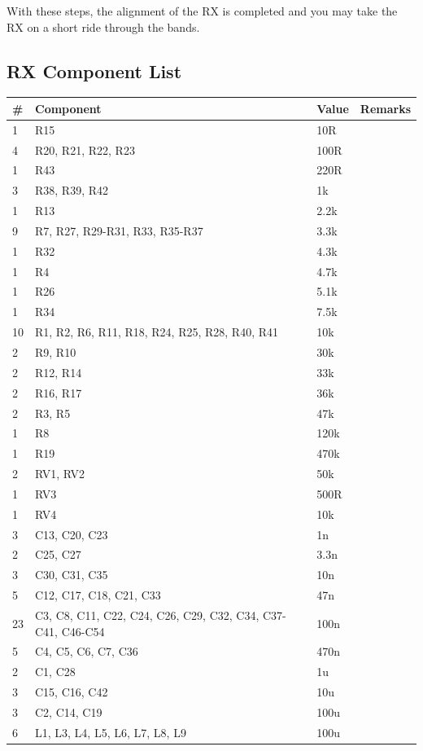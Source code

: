 \documentclass[10pt, a4paper,twoside,openright]{scrartcl}
\begin{document}
With these steps, the alignment of the RX is completed and you may take the RX on a short ride through the bands.

\clearpage
\subsection{RX Component List}  \label{sec:rxcomp}
\begin{longtable}{|l|p{6cm}|l|l|} \hline 
\# & Component & Value & Remarks \\ \hline 
1 & R15 & 10R & \\
4 & R20, R21, R22, R23 & 100R & \\
1 & R43 & 220R & \\
3 & R38, R39, R42 & 1k & \\
1 & R13 & 2.2k & \\
9 & R7, R27, R29-R31, R33, R35-R37 & 3.3k & \\
1 & R32 & 4.3k & \\
1 & R4 & 4.7k & \\
1 & R26 & 5.1k & \\
1 & R34 & 7.5k & \\
10 & R1, R2, R6, R11, R18, R24, R25, R28, R40, R41 & 10k & \\
2 & R9, R10 & 30k & \\
2 & R12, R14 & 33k & \\
2 & R16, R17 & 36k & \\
2 & R3, R5 & 47k & \\
1 & R8 & 120k & \\
1 & R19 & 470k & \\
2 & RV1, RV2 & 50k & \\
1 & RV3 & 500R & \\
1 & RV4 & 10k & \\
3 & C13, C20, C23 & 1n & \\
2 & C25, C27 & 3.3n & \\
3 & C30, C31, C35 & 10n & \\
5 & C12, C17, C18, C21, C33 & 47n & \\
23 & C3, C8, C11, C22, C24, C26, C29, C32, C34, C37-C41, C46-C54 & 100n & \\
5 & C4, C5, C6, C7, C36 & 470n & \\
2 & C1, C28 & 1u & \\
3 & C15, C16, C42 & 10u & \\
3 & C2, C14, C19 & 100u & \\
6 & L1, L3, L4, L5, L6, L7, L8, L9 & 100u & \\

\end{longtable}
\end{document}
